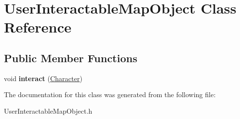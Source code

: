 \hypertarget{class_user_interactable_map_object}{}\section{User\+Interactable\+Map\+Object Class Reference}
\label{class_user_interactable_map_object}
\subsection*{Public Member Functions}
\begin{DoxyCompactItemize}
\item 
\hypertarget{class_user_interactable_map_object_a40da4c8b7f9edd187551df96a313d611}{}void {\bfseries interact} (\hyperlink{class_character}{Character})\label{class_user_interactable_map_object_a40da4c8b7f9edd187551df96a313d611}

\end{DoxyCompactItemize}


The documentation for this class was generated from the following file\+:\begin{DoxyCompactItemize}
\item 
User\+Interactable\+Map\+Object.\+h\end{DoxyCompactItemize}
